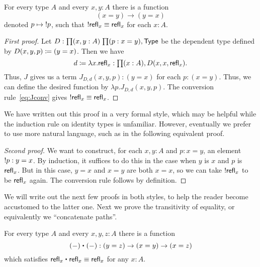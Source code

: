\begin{lem}\label{lem:opp}
  For every type $A$ and every $x,y:A$ there is a function
  \begin{equation*}
    (x= y)\to(y= x)
  \end{equation*}
  denoted $p\mapsto \mathord{!{p}}$, such that $\mathord{!{\mathsf{refl}_{x}}}\equiv\mathsf{refl}_{x}$ for each $x:A$.
\end{lem}
\begin{proof}[First proof]
  Let $D:\prd{x,y:A}{p:x= y} \type$ be the dependent type defined by $D(x,y,p)\coloneqq (y= x)$.
  Then we have
  \begin{equation*}
    d\defeq \lambda x.\refl{x}:\prd{x:A} D(x,x,\refl{x}).
  \end{equation*}
  Thus, $J$ gives us a term $J_{D,d}(x,y,p): (y= x)$ for each $p:(x= y)$.
  Thus, we can define the desired function by $\lambda p. J_{D,d}(x,y,p)$.
  The conversion rule~\eqref{eq:Jconv} gives $\mathord{!{\mathsf{refl}_{x}}}\equiv \mathsf{refl}_{x}$.
\end{proof}

We have written out this proof in a very formal style, which may be helpful while the induction rule on identity types is unfamiliar.
However, eventually we prefer to use more natural language, such as in the following equivalent proof.

\begin{proof}[Second proof]
  We want to construct, for each $x,y:A$ and $p:x=y$, an element $\mathord{!{p}}:y=x$.
  By induction, it suffices to do this in the case when $y$ is $x$ and $p$ is $\mathsf{refl}_{x}$.
  But in this case, $y=x$ and $x=y$ are both $x=x$, so we can take $\mathord{!{\mathsf{refl}_{x}}}$ to be $\mathsf{refl}_{x}$ again.
  The conversion rule follows by definition.
\end{proof}

We will write out the next few proofs in both styles, to help the reader become accustomed to the latter one.
Next we prove the transitivity of equality, or equivalently we ``concatenate paths''.

\begin{lem}\label{lem:concat}
  For every type $A$ and every $x,y,z:A$ there is a function
  \begin{equation*}
    {(-)}\ct{(-)}:(y= z)\to (x= y)\to (x=  z)
  \end{equation*}
  which satisfies $\refl{x}\ct \refl{x}\jdeq \refl{x}$ for any $x:A$.
\end{lem}

